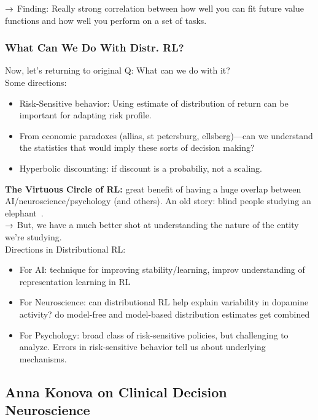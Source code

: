$\rightarrow$ Finding: Really strong correlation between how well you can fit future value functions and how well you perform on a set of tasks.

\subsubsection{What Can We Do With Distr. RL?}

Now, let's returning to original Q: What can we do with it? \\

Some directions:
\begin{itemize}
    \item Risk-Sensitive behavior: Using estimate of distribution of return can be important for adapting risk profile.
    \item From economic paradoxes (allias, st petersburg, ellsberg)---can we understand the statistics that would imply these sorts of decision making?
    \item Hyperbolic discounting: if discount is a probabiliy, not a scaling.
\end{itemize}


{\bf The Virtuous Circle of RL:} great benefit of having a huge overlap between AI/neuroscience/psychology (and others). An old story: blind people studying an elephant~\cite{saxe1994blind}. \\

$\rightarrow$ But, we have a much better shot at understanding the nature of the entity we're studying. \\

Directions in Distributional RL:
\begin{itemize}
    \item For AI: technique for improving stability/learning, improv understanding of representation learning in RL
    \item For Neuroscience: can distributional RL help explain variability in dopamine activity? do model-free and model-based distribution estimates get combined
    \item For Psychology: broad class of risk-sensitive policies, but challenging to analyze. Errors in risk-sensitive behavior tell us about underlying mechanisms.
\end{itemize}

\spacerule


\subsection{Anna Konova on Clinical Decision Neuroscience}

